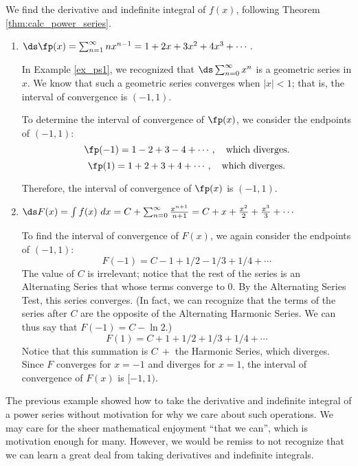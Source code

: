 {We find the derivative and indefinite integral of $f(x)$, following Theorem \ref{thm:calc_power_series}.\\

\begin{enumerate}

\item $\ds \fp(x) = \sum_{n=1}^\infty nx^{n-1} = 1+2x+3x^2+4x^3+\cdots.$

In Example \ref{ex_ps1}, we recognized that $\ds \sum_{n=0}^\infty x^n$ is a geometric series in $x$. We know that such a geometric series converges when $|x|<1$; that is, the interval of convergence is $(-1,1)$.

To determine the interval of convergence of $\fp(x)$, we consider the endpoints of $(-1,1)$:
$$\fp(-1) =  1-2+3-4+\cdots,\quad \text{which diverges.}$$
$$\fp(1) = 1+2+3+4+\cdots,\quad \text{which diverges.}$$

Therefore, the interval of convergence of $\fp(x)$ is $(-1,1)$. 

\item $\ds F(x) = \int f(x)\ dx = C+\sum_{n=0}^\infty \frac{x^{n+1}}{n+1} = C+ x+\frac{x^2}{2}+\frac{x^3}3+\cdots$

To find the interval of convergence of $F(x)$, we again consider the endpoints of $(-1,1)$:
$$F(-1) = C-1+1/2-1/3+1/4+\cdots$$
The value of $C$ is irrelevant; notice that the rest of the series is an Alternating Series that whose terms converge to 0. By the Alternating Series Test, this series converges. (In fact, we can recognize that the terms of the series after $C$ are the opposite of the Alternating Harmonic Series. We can thus say that $F(-1) = C-\ln 2$.)
$$F(1) = C+1+1/2+1/3+1/4+\cdots$$
Notice that this summation is $C\ +$ the Harmonic Series, which diverges. Since $F$ converges for $x=-1$ and diverges for $x=1$, the interval of convergence of $F(x)$ is $[-1,1)$.
\end{enumerate}}

The previous example showed how to take the derivative and indefinite integral of a power series without motivation for why we care about such operations. We may care for the sheer mathematical enjoyment ``that we can'', which is motivation enough for many. However, we would be remiss to not recognize that we can learn a great deal from taking derivatives and indefinite integrals.\bigskip

